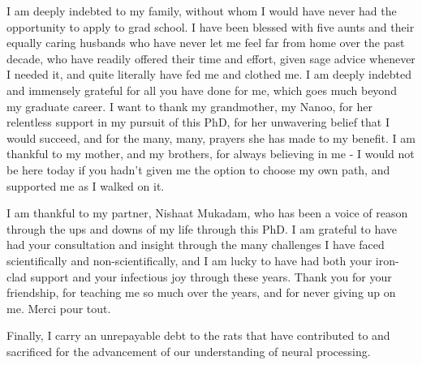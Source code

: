 \documentclass{brandeis-dissertation3.12}
\begin{document}
\begin{doublespace}
I am deeply indebted to my family, without whom I would have never had the opportunity to apply to grad school. I have been blessed with five aunts and their equally caring husbands who have never let me feel far from home over the past decade, who have readily offered their time and effort, given sage advice whenever I needed it, and quite literally have fed me and clothed me. I am deeply indebted and immensely grateful for all you have done for me, which goes much beyond my graduate career. I want to thank my grandmother, my Nanoo, for her relentless support in my pursuit of this PhD, for her unwavering belief that I would succeed, and for the many, many, prayers she has made to my benefit. I am thankful to my mother, and my brothers, for always believing in me - I would not be here today if you hadn’t given me the option to choose my own path, and supported me as I walked on it.

I am thankful to my partner, Nishaat Mukadam, who has been a voice of reason through the ups and downs of my life through this PhD. I am grateful to have had your consultation and insight through the many challenges I have faced scientifically and non-scientifically, and I am lucky to have had both your iron-clad support and your infectious joy through these years. Thank you for your friendship, for teaching me so much over the years, and for never giving up on me. Merci pour tout.

Finally, I carry an unrepayable debt to the rats that have contributed to and sacrificed for the advancement of our understanding of neural processing.
\end{doublespace}

\newpage
\end{document}
